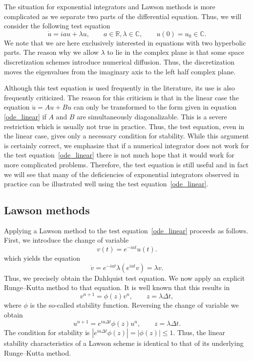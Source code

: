 The situation for exponential integrators and Lawson methods is more complicated as we separate two parts of the differential equation. Thus, we will consider the following test equation
\begin{equation}
  \label{ode_linear}
  \dot{u} = ia u + \lambda u, \qquad a\in\mathbb{R}, \lambda\in\mathbb{C}, \qquad u(0) = u_0\in\mathbb{C}.
\end{equation}
We note that we are here exclusively interested in equations with two hyperbolic parts. The reason why we allow $\lambda$ to lie in the complex plane is that some space discretization schemes introduce numerical diffusion. Thus, the discretization moves the eigenvalues from the imaginary axis to the left half complex plane.

Although this test equation is used frequently in the literature, its use is also frequently criticized. The reason for this criticism is that in the linear case the equation $\dot{u} = Au + Bu$ can only be transformed to the form given in equation \eqref{ode_linear} if $A$ and $B$ are simultaneously diagonalizable. This is a severe restriction which is usually not true in practice. Thus, the test equation, even in the linear case, gives only a necessary condition for stability. While this argument is certainly correct, we emphasize that if a numerical integrator does not work for the test equation~\eqref{ode_linear} there is not much hope that it would work for more complicated problems. Therefore, the test equation is still useful and in fact we will see that many of the deficiencies of exponential integrators observed in practice can be illustrated well using the test equation~\eqref{ode_linear}.


\subsection{Lawson methods}

Applying a Lawson method to the test equation~\eqref{ode_linear} proceeds as follows. First, we introduce the change of variable
\[
  v(t)=e^{-iat} u(t).
\]
which yields the equation
\[
  \dot{v} = e^{-iat} \lambda (e^{iat }v) = \lambda v.
\]
Thus, we precisely obtain the  Dahlquist test equation. We now apply an explicit Runge--Kutta method to that equation. It is well known that this results in
\[
  v^{n+1} = \phi(z) v^n, \qquad z=\lambda \Delta t,
\]
where $\phi$ is the so-called stability function. Reversing the change of variable we obtain
\[
  u^{n+1} = e^{ia\Delta t} \phi(z) u^{n}, \qquad z=\lambda \Delta t.
\]
The condition for stability is $| e^{ia\Delta t} \phi(z) | = | \phi(z) | \leq 1$. Thus, the linear stability characteristics of a Lawson scheme is identical to that of its underlying Runge--Kutta method. 

